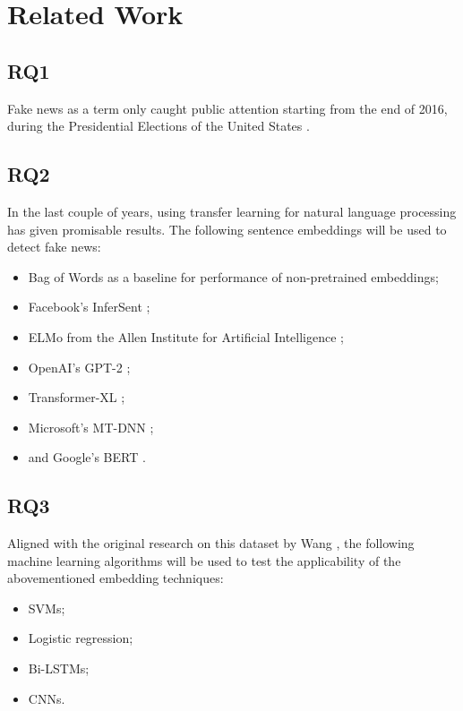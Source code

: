 \section{Related Work}
\label{sec:rel}

\subsection{RQ1}
Fake news as a term only caught public attention starting from the end of 2016, during the Presidential Elections of the United States \cite{googletrends2019}.   

\subsection{RQ2}
In the last couple of years, using transfer learning for natural language processing has given promisable results. The following sentence embeddings will be used to detect fake news:

\begin{itemize}
    \item Bag of Words as a baseline for performance of non-pretrained embeddings;
    \item Facebook's InferSent \cite{conneau2017};
    \item ELMo from the Allen Institute for Artificial Intelligence \cite{peters2018};
    \item OpenAI's GPT-2 \cite{radford2019};
    \item Transformer-XL \cite{dai2019};
    \item Microsoft's MT-DNN  \cite{liu2019};
    \item and Google's BERT \cite{devlin2018}.
\end{itemize}

\subsection{RQ3}
Aligned with the original research on this dataset by Wang \cite{wang2018}, the following machine learning algorithms will be used to test the applicability of the abovementioned embedding techniques: 
\begin{itemize}
    \item SVMs;
    \item Logistic regression;
    \item Bi-LSTMs;
    \item CNNs.
\end{itemize}